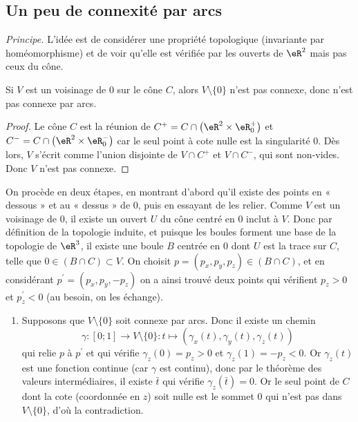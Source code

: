 
\subsection{Un peu de connexité par arcs}

\emph{Principe.} L'idée est de considérer une propriété topologique
(invariante par homéomorphisme) et de voir qu'elle est vérifiée par
les ouverts de $\eR^2$ mais pas ceux du cône.

\begin{lemma}Si $V$ est un voisinage de $0$ sur le cône $C$, alors
	$V\setminus\{0\}$ n'est pas connexe, donc n'est pas connexe par
	arcs.
\end{lemma}

\begin{proof}Le cône $C$ est la réunion de $C^+ = C \cap\left(\eR^2\times \eR_0^+\right)$ et $C^- = C \cap \left(\eR^2\times\eR_0^-\right)$ car le seul point à cote nulle est la singularité
	$0$. Dès lors, $V$ s'écrit comme l'union disjointe de $V\cap C^+$
	et $V\cap C^-$, qui sont non-vides. Donc $V$ n'est pas connexe.
\end{proof}

On procède en deux étapes, en montrant d'abord qu'il
existe des points en « dessous » et au « dessus » de
$0$, puis en essayant de les relier.
Comme $V$ est un voisinage de $0$, il existe un ouvert $U$ du
cône centré en $0$ inclut à $V$. Donc par définition de la
topologie induite, et puisque les boules forment une base de la
topologie de $\eR^3$, il existe une boule $B$ centrée en $0$ dont
$U$ est la trace sur $C$, telle que $0 \in (B \cap C) \subset V$. On choisit $p = (p_x,p_y,p_z) \in (B \cap C)$, et en
considérant $p^\prime = (p_x, p_y, -p_z)$ on a ainsi trouvé deux
points qui vérifient $p_z > 0$ et $p^\prime_z < 0$ (au besoin,
on les échange).

\begin{enumerate}
	\item Supposons que $V\setminus\{0\}$ soit connexe par arcs. Donc
	      il existe un chemin
	      \[\gamma : [0;1] \to V\setminus\{0\} : t \mapsto
		      (\gamma_x(t),\gamma_y(t),\gamma_z(t))\] qui relie $p$ à
	      $p^\prime$ et qui vérifie $\gamma_z(0) = p_z > 0$ et
	      $\gamma_z(1) = -p_z < 0$. Or $\gamma_z(t)$ est une fonction
	      continue (car $\gamma$ est continu), donc par le théorème des
	      valeurs intermédiaires, il existe $\bar t$ qui vérifie
	      $\gamma_z(\bar t) = 0$. Or le seul point de $C$ dont la cote
	      (coordonnée en $z$) soit nulle est le sommet $0$ qui n'est pas
	      dans $V\setminus\{0\}$, d'où la contradiction.
\end{enumerate}


